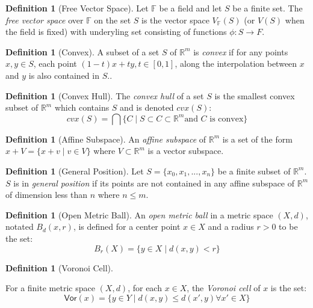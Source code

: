 \documentclass[ma]{uncgdissertationexp}
\theoremstyle{plain}
\theoremstyle{definition}
\newtheorem{definition}[theorem]{Definition}
\theoremstyle{remark}
\begin{document}
\begin{definition}[Free Vector Space]
\par Let $\mathbb{F}$ be a field and let $S$ be a finite set. The \textit{free vector space} over $\mathbb{F}$ on the set $S$ is the vector space $V_{\mathbb{F}}(S)$ (or $V(S)$ when the field is fixed) with underyling set consisting of functions $\phi: S \rightarrow F$.
\end{definition}

\begin{definition}[Convex]
\par A subset of a set $S$ of $\mathbb{R}^m$ is \textit{convex} if for any points $x, y \in S$, each point $(1-t)x+ty, t\in [0,1]$, along the interpolation between $x$ and $y$ is also contained in $S$..
\end{definition}

\begin{definition}[Convex Hull]
\par The \textit{convex hull} of a set $S$ is the smallest convex subset of $\mathbb{R}^m$ which contains $S$ and is denoted $cvx(S)$:
$$cvx(S) = \bigcap\{C \mid S\subset C \subset \mathbb{R}^m \text{and } C \text{ is convex}\}$$
\end{definition}

\begin{definition}[Affine Subspace]
\par An \textit{affine subspace} of $\mathbb{R}^m$ is a set of the form
$x+V = \{x + v \mid v\in V\}$ where $V\subset\mathbb{R}^m$ is a vector subspace.
\end{definition}

\begin{definition}[General Position]
Let $S=\{x_0, x_1, ..., x_n\}$ be a finite subset of $\mathbb{R}^m$. $S$ is in \textit{general position} if its points are not contained in any affine subspace of $\mathbb{R}^m$ of dimension less than $n$ where $n\leq m$.
\end{definition}

\begin{definition}[Open Metric Ball]
\par An \textit{open metric ball} in a metric space $(X, d)$, notated $B_{d}(x, r)$, is defined for a center point $x\in X$ and a radius $r>0$ to be the set:
$$B_{r}(X) = \{y\in X \mid d(x,y)<r\}$$
\end{definition}

\begin{definition}[Voronoi Cell]
\label{def:voronoi}
\par For a finite metric space $(X, d)$, for each $x\in X$, the \textit{Voronoi cell} of $x$ is the set:
$$\mathsf{Vor}(x) = \{y\in Y \mid d(x,y) \leq d(x', y) \forall x' \in X\}$$
\end{definition}
\end{document}
